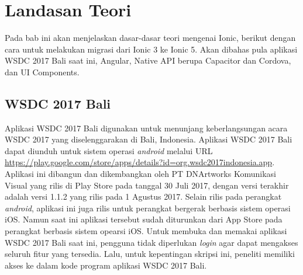 \setcounter{secnumdepth}{4}
\chapter{Landasan Teori}
\label{chap:teori}

Pada bab ini akan menjelaskan dasar-dasar teori mengenai Ionic, berikut dengan cara untuk melakukan migrasi dari Ionic 3 ke Ionic 5. Akan dibahas pula aplikasi WSDC 2017 Bali saat ini, Angular, Native API berupa Capacitor dan Cordova, dan UI Components.

\section{WSDC 2017 Bali}
\label{sec:wsdc2017bali}

Aplikasi WSDC 2017 Bali digunakan untuk menunjang keberlangsungan acara WSDC 2017 yang diselenggarakan di Bali, Indonesia. Aplikasi WSDC 2017 Bali dapat diunduh untuk sistem operasi {\it android} melalui URL \url{https://play.google.com/store/apps/details?id=org.wsdc2017indonesia.app}. Aplikasi ini dibangun dan dikembangkan oleh PT DNArtworks Komunikasi Visual yang rilis di Play Store pada tanggal 30 Juli 2017, dengan versi terakhir adalah versi 1.1.2 yang rilis pada 1 Agustus 2017. Selain rilis pada perangkat {\it android}, aplikasi ini juga rilis untuk perangkat bergerak berbasis sistem operasi iOS. Namun saat ini aplikasi tersebut sudah diturunkan dari App Store pada perangkat berbasis sistem opearsi iOS. Untuk membuka dan memakai aplikasi WSDC 2017 Bali saat ini, pengguna tidak diperlukan {\it login} agar dapat mengakses seluruh fitur yang tersedia. Lalu, untuk kepentingan skripsi ini, peneliti memiliki akses ke dalam kode program aplikasi WSDC 2017 Bali.

